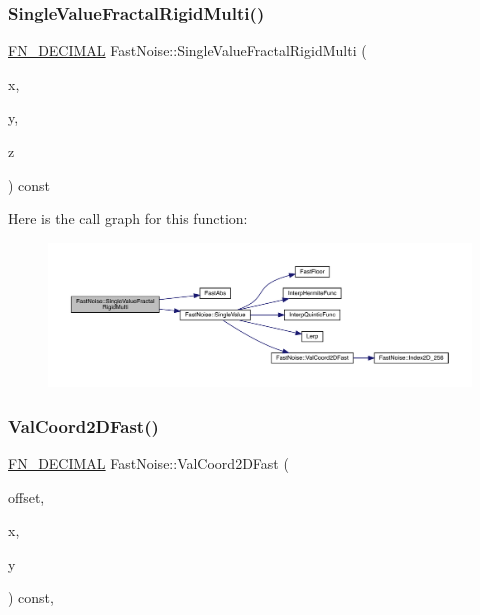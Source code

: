 \subsubsection{\texorpdfstring{Single\+Value\+Fractal\+Rigid\+Multi()}{SingleValueFractalRigidMulti()}\hspace{0.1cm}{\footnotesize\ttfamily [2/2]}}
{\footnotesize\ttfamily \mbox{\hyperlink{_fast_noise_8h_a75a9ef6d2541c4921815b885bfd449c3}{F\+N\+\_\+\+D\+E\+C\+I\+M\+AL}} Fast\+Noise\+::\+Single\+Value\+Fractal\+Rigid\+Multi (\begin{DoxyParamCaption}\item[{\mbox{\hyperlink{_fast_noise_8h_a75a9ef6d2541c4921815b885bfd449c3}{F\+N\+\_\+\+D\+E\+C\+I\+M\+AL}}}]{x,  }\item[{\mbox{\hyperlink{_fast_noise_8h_a75a9ef6d2541c4921815b885bfd449c3}{F\+N\+\_\+\+D\+E\+C\+I\+M\+AL}}}]{y,  }\item[{\mbox{\hyperlink{_fast_noise_8h_a75a9ef6d2541c4921815b885bfd449c3}{F\+N\+\_\+\+D\+E\+C\+I\+M\+AL}}}]{z }\end{DoxyParamCaption}) const\hspace{0.3cm}{\ttfamily [private]}}

Here is the call graph for this function\+:
\nopagebreak
\begin{figure}[H]
\begin{center}
\leavevmode
\includegraphics[width=350pt]{class_fast_noise_a252117bcf7130247e06fa0bd1695c41e_cgraph}
\end{center}
\end{figure}
\mbox{\label{class_fast_noise_ace751d0f7929c892937cd97f3e0341a7}} 
\subsubsection{\texorpdfstring{Val\+Coord2\+D\+Fast()}{ValCoord2DFast()}}
{\footnotesize\ttfamily \mbox{\hyperlink{_fast_noise_8h_a75a9ef6d2541c4921815b885bfd449c3}{F\+N\+\_\+\+D\+E\+C\+I\+M\+AL}} Fast\+Noise\+::\+Val\+Coord2\+D\+Fast (\begin{DoxyParamCaption}\item[{unsigned char}]{offset,  }\item[{int}]{x,  }\item[{int}]{y }\end{DoxyParamCaption}) const\hspace{0.3cm}{\ttfamily [inline]}, {\ttfamily [private]}}

